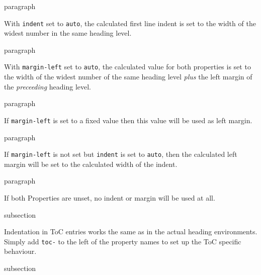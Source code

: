 \begin{Heading}{paragraph}
\end{Heading}

With \lstinline{indent} set to \lstinline{auto}, the calculated first
line indent is set to the width of the widest number in the same
heading level.

\begin{Heading}{paragraph}
\end{Heading}

With \lstinline{margin-left} set to \lstinline{auto}, the calculated
value for both properties is set to the width of the widest number of
the same heading level \textit{plus} the left margin of the
\textit{preceeding} heading level.

\begin{Heading}{paragraph}
\end{Heading}


If \lstinline{margin-left} is set to a fixed value then this value
will be used as left margin.

\begin{Heading}{paragraph}
\end{Heading}


If \lstinline{margin-left} is not set but \lstinline{indent} is set to
\lstinline{auto}, then the calculated left margin will be set to the
calculated width of the indent.

\begin{Heading}{paragraph}
\end{Heading}

If both Properties are unset, no indent or margin will be used at all.


\begin{Heading}[label=sec:hdg:toc-indent]{subsection}
\end{Heading}

Indentation in ToC entries works the same as in the actual heading
environments. Simply add \lstinline{toc-} to the left of the property
names to set up the ToC specific behaviour.


\begin{Heading}[label=sec:hdg:unnumbered-indent]{subsection}
\end{Heading}

